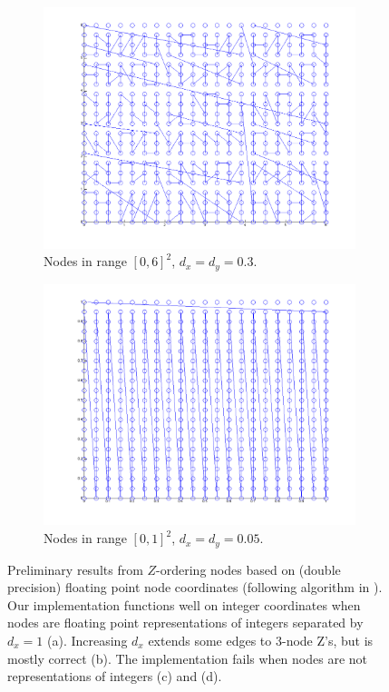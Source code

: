 \documentclass{report}
\begin{document}
\begin{figure}
\begin{subfigure}[t]{0.48\textwidth}
\centering
\includegraphics[width=\textwidth]{stencils_content/scale3em1.png}
\caption{Nodes in range $[0,6]^2$, $d_x = d_y = 0.3$.  }
\label{fig:connor_fails}
\end{subfigure}
\quad
\begin{subfigure}[t]{0.48\textwidth}
\centering
\includegraphics[width=\textwidth]{stencils_content/range0_1.png}
\caption{Nodes in range $[0,1]^2$, $d_x = d_y = 0.05$. }
\label{fig:connor_fails2}
\end{subfigure}
\caption{Preliminary results from $Z$-ordering nodes based on  (double precision) floating point node coordinates (following algorithm in \cite{Connor2009}). Our implementation functions well on integer coordinates when nodes are floating point representations of integers separated by $d_x = 1$ (a). Increasing $d_x$ extends some edges to 3-node Z's, but is mostly correct (b). The implementation fails when nodes are not representations of integers (c) and (d).}
\label{fig:float_z_results}
\end{figure}


\ifstandalone


\end{document}
